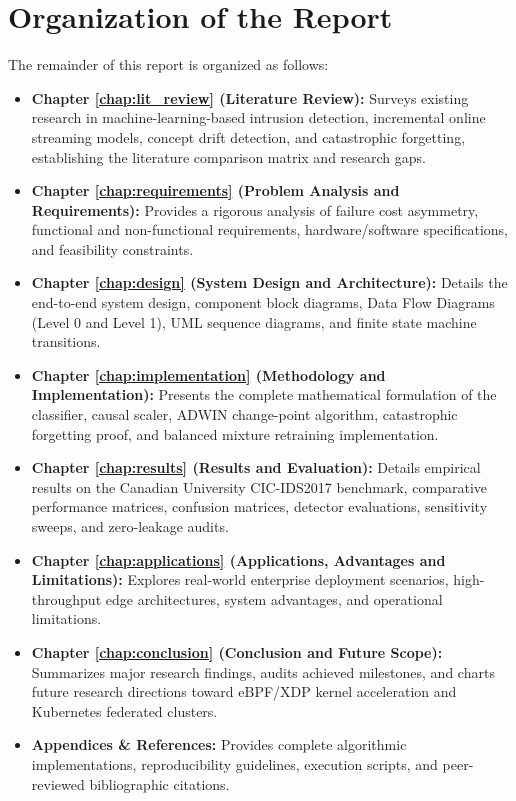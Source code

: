 \documentclass[12pt,a4paper,oneside]{report}
\begin{document}
\section{Organization of the Report}
The remainder of this report is organized as follows:
\begin{itemize}
    \item \textbf{Chapter \ref{chap:lit_review} (Literature Review):} Surveys existing research in machine-learning-based intrusion detection, incremental online streaming models, concept drift detection, and catastrophic forgetting, establishing the literature comparison matrix and research gaps.
    \item \textbf{Chapter \ref{chap:requirements} (Problem Analysis and Requirements):} Provides a rigorous analysis of failure cost asymmetry, functional and non-functional requirements, hardware/software specifications, and feasibility constraints.
    \item \textbf{Chapter \ref{chap:design} (System Design and Architecture):} Details the end-to-end system design, component block diagrams, Data Flow Diagrams (Level 0 and Level 1), UML sequence diagrams, and finite state machine transitions.
    \item \textbf{Chapter \ref{chap:implementation} (Methodology and Implementation):} Presents the complete mathematical formulation of the classifier, causal scaler, ADWIN change-point algorithm, catastrophic forgetting proof, and balanced mixture retraining implementation.
    \item \textbf{Chapter \ref{chap:results} (Results and Evaluation):} Details empirical results on the Canadian University CIC-IDS2017 benchmark, comparative performance matrices, confusion matrices, detector evaluations, sensitivity sweeps, and zero-leakage audits.
    \item \textbf{Chapter \ref{chap:applications} (Applications, Advantages and Limitations):} Explores real-world enterprise deployment scenarios, high-throughput edge architectures, system advantages, and operational limitations.
    \item \textbf{Chapter \ref{chap:conclusion} (Conclusion and Future Scope):} Summarizes major research findings, audits achieved milestones, and charts future research directions toward eBPF/XDP kernel acceleration and Kubernetes federated clusters.
    \item \textbf{Appendices \& References:} Provides complete algorithmic implementations, reproducibility guidelines, execution scripts, and peer-reviewed bibliographic citations.
\end{itemize}
\end{document}
